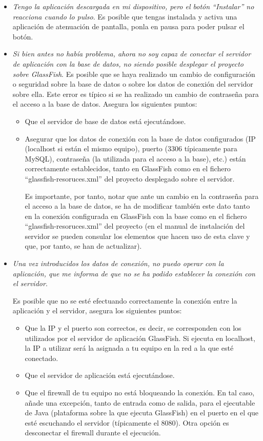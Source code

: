 \begin{itemize}
	\item \textit{Tengo la aplicación descargada en mi dispositivo, pero el botón ``Instalar'' no reacciona cuando lo pulso}. Es posible que tengas instalada y activa una aplicación de atenuación de pantalla, ponla en pausa para poder pulsar el botón.
	
	\item \textit{Si bien antes no había problema, ahora no soy capaz de conectar el servidor de aplicación con la base de datos, no siendo posible desplegar el proyecto sobre GlassFish}. Es posible que se haya realizado un cambio de configuración o seguridad sobre la base de datos o sobre los datos de conexión del servidor sobre ella. Este error es típico si se ha realizado un cambio de contraseña para el acceso a la base de datos. Asegura los siguientes puntos:
	
	\begin{itemize}
		\item Que el servidor de base de datos está ejecutándose.
		\item Asegurar que los datos de conexión con la base de datos configurados (IP (localhost si están el mismo equipo), puerto (3306 típicamente para MySQL), contraseña (la utilizada para el acceso a la base), etc.) están correctamente establecidos, tanto en GlassFish como en el fichero ``glassfish-resoruces.xml'' del proyecto desplegado sobre el servidor. 
		
		Es importante, por tanto, notar que ante un cambio en la contraseña para el acceso a la base de datos, se ha de modificar también este dato tanto en la conexión configurada en GlassFish con la base como en el fichero ``glassfish-resoruces.xml'' del proyecto (en el manual de instalación del servidor se pueden consular los elementos que hacen uso de esta clave y que, por tanto, se han de actualizar).
	\end{itemize}
	
	\item \textit{Una vez introducidos los datos de conexión, no puedo operar con la aplicación, que me informa de que no se ha podido establecer la conexión con el servidor}.
	
	Es posible que no se esté efectuando correctamente la conexión entre la aplicación y el servidor, asegura los siguientes puntos:
	\begin{itemize}
		\item Que la IP y el puerto son correctos, es decir, se corresponden con los utilizados por el servidor de aplicación GlassFish. Si ejecuta en localhost, la IP a utilizar será la asignada a tu equipo en la red a la que esté conectado.
		\item Que el servidor de aplicación está ejecutándose.
		\item Que el firewall de tu equipo no está bloqueando la conexión. En tal caso, añade una excepción, tanto de entrada como de salida, para el ejecutable de Java (plataforma sobre la que ejecuta GlassFish) en el puerto en el que esté escuchando el servidor (típicamente el 8080). Otra opción es desconectar el firewall durante el ejecución.
	\end{itemize}
	
	
\end{itemize}

